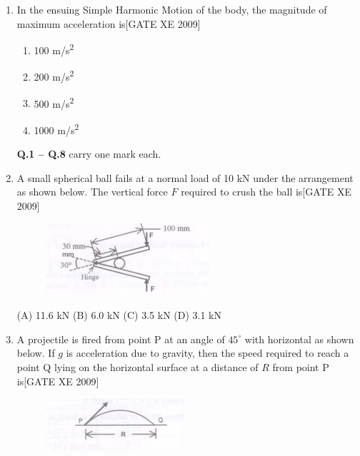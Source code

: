 \documentclass[journal,12pt,onecolumn]{IEEEtran}
\theoremstyle{remark}
\begin{document}
\begin{enumerate}
\begin{enumerate}
\vspace{0.3cm}

\item[ \textbf{Q.24}] In the ensuing Simple Harmonic Motion of the body, the magnitude of maximum acceleration is\hfill[GATE XE 2009]
\begin{multicols}{2}
\begin{enumerate}
    \item 100 m/s\textsuperscript{2}
    \item 200 m/s\textsuperscript{2}
    \item 500 m/s\textsuperscript{2}
    \item 1000 m/s\textsuperscript{2}
\end{enumerate}
\end{multicols}

\bigskip
\begin{center}

\end{center}
\clearpage

\textbf{Q.1 -- Q.8} carry one mark each.

\vspace{1em}


\item[\textbf{Q.1}] A small spherical ball fails at a normal load of 10 kN under the arrangement as shown below. The vertical force $F$ required to crush the ball is\hfill[GATE XE 2009]
\begin{figure}[h]
    \centering
    \includegraphics[width=0.5\columnwidth]{figs/fig6.png}

\end{figure}

    (A) 11.6 kN \hfill
    (B) 6.0 kN \hfill
   (C) 3.5 kN \hfill
   (D) 3.1 kN


\vspace{1em}

\noindent
\item[\textbf{Q.2}] A projectile is fired from point P at an angle of $45^\circ$ with horizontal as shown below. If $g$ is acceleration due to gravity, then the speed required to reach a point Q lying on the horizontal surface at a distance of $R$ from point P is\hfill[GATE XE 2009]
\begin{figure}[h]
\centering
   \includegraphics[width=0.5\columnwidth]{figs/fig7.png}
    \end{figure}\\


\end{enumerate}
\end{enumerate}
\end{document}

